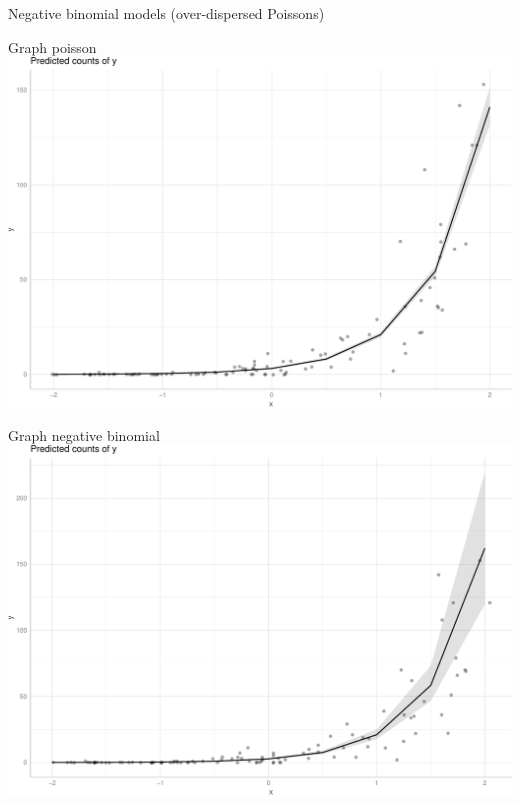 \documentclass[
  ignorenonframetext,
]{beamer}
\begin{document}
\begin{frame}[fragile]{Negative binomial models (over-dispersed
Poissons)}
\begin{block}{Graph poisson}
\protect\hypertarget{graph-poisson}{}
\includegraphics{slides_files/figure-beamer/unnamed-chunk-43-1.pdf}
\end{block}

\begin{block}{Graph negative binomial}
\protect\hypertarget{graph-negative-binomial}{}
\includegraphics{slides_files/figure-beamer/unnamed-chunk-44-1.pdf}
\end{block}


\end{frame}
\end{document}

